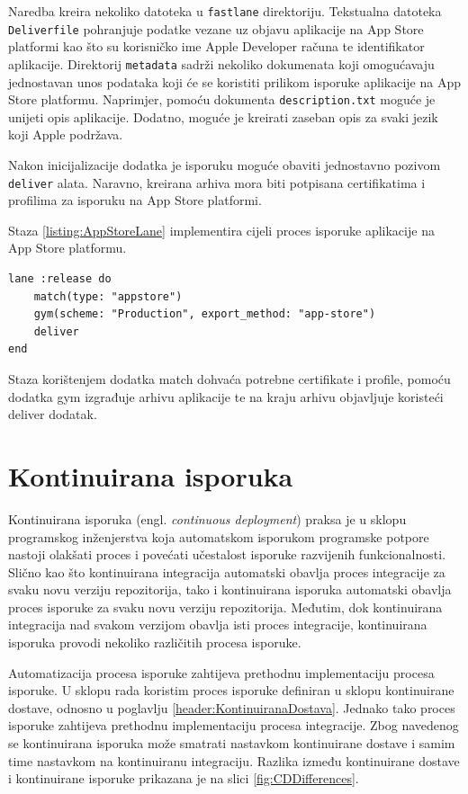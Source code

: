 \documentclass[times, utf8, diplomski, numeric]{fer}
\newcommand{\eng}[1]{(engl. \textit{#1})}
\begin{document}
Naredba kreira nekoliko datoteka u \verb|fastlane| direktoriju. Tekstualna datoteka \verb|Deliverfile| pohranjuje podatke vezane uz objavu aplikacije na App Store platformi kao što su korisničko ime Apple Developer računa te identifikator aplikacije. Direktorij \verb|metadata| sadrži nekoliko dokumenata koji omogućavaju jednostavan unos podataka koji će se koristiti prilikom isporuke aplikacije na App Store platformu. Naprimjer, pomoću dokumenta \verb|description.txt| moguće je unijeti opis aplikacije. Dodatno, moguće je kreirati zaseban opis za svaki jezik koji Apple podržava.

Nakon inicijalizacije dodatka je isporuku moguće obaviti jednostavno pozivom \verb|deliver| alata. Naravno, kreirana arhiva mora biti potpisana certifikatima i profilima za isporuku na App Store platformi.

Staza \ref{listing:AppStoreLane} implementira cijeli proces isporuke aplikacije na App Store platformu.

\begin{lstlisting}[caption=Isporuka na App Store platformu korištenjem dodatka deliver, label=listing:AppStoreLane]
lane :release do
    match(type: "appstore")
    gym(scheme: "Production", export_method: "app-store")
    deliver
end
\end{lstlisting}

Staza korištenjem dodatka match dohvaća potrebne certifikate i profile, pomoću dodatka gym izgrađuje arhivu aplikacije te na kraju arhivu objavljuje koristeći deliver dodatak.



\chapter{Kontinuirana isporuka} \label{header:KontinuiranaIsporuka}

Kontinuirana isporuka \eng{continuous deployment} praksa je u sklopu programskog inženjerstva koja automatskom isporukom programske potpore nastoji olakšati proces i povećati učestalost isporuke razvijenih funkcionalnosti. Slično kao što kontinuirana integracija automatski obavlja proces integracije za svaku novu verziju repozitorija, tako i kontinuirana isporuka automatski obavlja proces isporuke za svaku novu verziju repozitorija. Međutim, dok kontinuirana integracija nad svakom verzijom obavlja isti proces integracije, kontinuirana isporuka provodi nekoliko različitih procesa isporuke.

Automatizacija procesa isporuke zahtijeva prethodnu implementaciju procesa isporuke. U sklopu rada koristim proces isporuke definiran u sklopu kontinuirane dostave, odnosno u poglavlju \ref{header:KontinuiranaDostava}. Jednako tako proces isporuke zahtijeva prethodnu implementaciju procesa integracije. Zbog navedenog se kontinuirana isporuka može smatrati nastavkom kontinuirane dostave i samim time nastavkom na kontinuiranu integraciju. Razlika između kontinuirane dostave i kontinuirane isporuke prikazana je na slici \ref{fig:CDDifferences}\citep{cd:whats_the_diff}.
\end{document}
